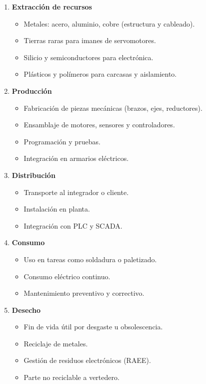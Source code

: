 \fsection[\textcolor{waveBlue2}{Ejercicio 10}]{\boldit{\textcolor{waveBlue2}{Investiga. }}{
}}

\begin{solution}


\begin{enumerate}
    \item \textbf{Extracción de recursos}
    \begin{itemize}
        \item Metales: acero, aluminio, cobre (estructura y cableado).
        \item Tierras raras para imanes de servomotores.
        \item Silicio y semiconductores para electrónica.
        \item Plásticos y polímeros para carcasas y aislamiento.
    \end{itemize}

    \item \textbf{Producción}
    \begin{itemize}
        \item Fabricación de piezas mecánicas (brazos, ejes, reductores).
        \item Ensamblaje de motores, sensores y controladores.
        \item Programación y pruebas.
        \item Integración en armarios eléctricos.
    \end{itemize}

    \item \textbf{Distribución}
    \begin{itemize}
        \item Transporte al integrador o cliente.
        \item Instalación en planta.
        \item Integración con PLC y SCADA.
    \end{itemize}

    \item \textbf{Consumo}
    \begin{itemize}
        \item Uso en tareas como soldadura o paletizado.
        \item Consumo eléctrico continuo.
        \item Mantenimiento preventivo y correctivo.
    \end{itemize}

    \item \textbf{Desecho}
    \begin{itemize}
        \item Fin de vida útil por desgaste u obsolescencia.
        \item Reciclaje de metales.
        \item Gestión de residuos electrónicos (RAEE).
        \item Parte no reciclable a vertedero.
    \end{itemize}
\end{enumerate}
\end{solution}
